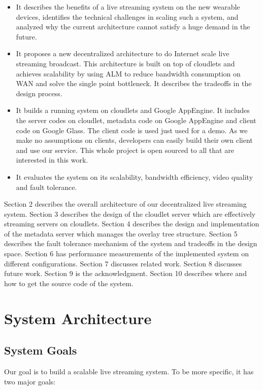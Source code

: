 \documentclass[letterpaper,twocolumn,10pt]{article}
\begin{document}
\begin{itemize}
  \item It describes the benefits of a live streaming system on the new wearable devices, identifies the technical challenges in scaling such a system, and analyzed why the current architecture cannot satisfy a huge demand in the future.
  \item It proposes a new decentralized architecture to do Internet scale live streaming broadcast. This architecture is built on top of cloudlets and achieves scalability by using ALM to reduce bandwidth consumption on WAN and solve the single point bottleneck. It describes the tradeoffs in the design process.
  \item It builds a running system on cloudlets and Google AppEngine. It includes the server codes on cloudlet, metadata code on Google AppEngine and client code on Google Glass. The client code is used just used for a demo. As we make no assumptions on clients, developers can easily build their own client and use our service. This whole project is open sourced to all that are interested in this work.
  \item It evaluates the system on its scalability, bandwidth efficiency, video quality and fault tolerance.  
\end{itemize}

Section 2 describes the overall architecture of our decentralized live streaming system. Section 3 describes the design of the cloudlet server which are effectively streaming servers on cloudlets. Section 4 describes the design and implementation of the metadata server which manages the overlay tree structure. Section 5 describes the fault tolerance mechanism of the system and tradeoffs in the design space. Section 6 has performance measurements of the implemented system on different configurations. Section 7 discusses related work. Section 8 discusses future work. Section 9 is the acknowledgment. Section 10 describes where and how to get the source code of the system.

\section{System Architecture}

\subsection{System Goals}
Our goal is to build a scalable live streaming system. To be more specific, it has two major goals:
\end{document}
